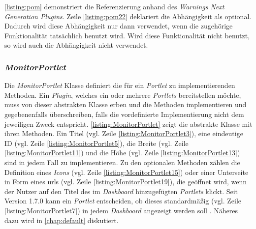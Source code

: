 

\autoref{listing:pom} demonstriert die Referenzierung anhand des \textit{Warnings Next Generation Plugins}. Zeile \autoref{listing:pom22} deklariert die Abhängigkeit als optional. Dadurch wird diese Abhängigkeit nur dann verwendet, wenn die zugehörige Funktionalität tatsächlich benutzt wird. Wird diese Funktionalität nicht benutzt, so wird auch die Abhängigkeit nicht verwendet.

\subsubsection{\textit{MonitorPortlet}}
Die \textit{MonitorPortlet} Klasse definiert die für ein \textit{Portlet} zu implementierenden Methoden. Ein \textit{Plugin}, welches ein oder mehrere \textit{Portlets} bereitstellen möchte, muss von dieser abstrakten Klasse erben und die Methoden implementieren und gegebenenfalls überschreiben, falls die vordefinierte Implementierung nicht dem jeweiligen Zweck entspricht. \autoref{listing:MonitorPortlet} zeigt die abstrakte Klasse mit ihren Methoden. Ein Titel (vgl. Zeile \autoref{listing:MonitorPortlet3}), eine eindeutige ID (vgl. Zeile \autoref{listing:MonitorPortlet5}), die Breite (vgl. Zeile \autoref{listing:MonitorPortlet11}) und die Höhe (vgl. Zeile \autoref{listing:MonitorPortlet13}) sind in jedem Fall zu implementieren. Zu den optionalen Methoden zählen die Definition eines \textit{Icons} (vgl. Zeile \autoref{listing:MonitorPortlet15}) oder einer Unterseite in Form eines \acp{url} (vgl. Zeile \autoref{listing:MonitorPortlet19}), die geöffnet wird, wenn der Nutzer auf den Titel des im \textit{Dashboard} hinzugefügten \textit{Portlets} klickt. Seit Version 1.7.0 kann ein \textit{Portlet} entscheiden, ob dieses standardmäßig (vgl. Zeile \autoref{listing:MonitorPortlet7}) in jedem \textit{Dashboard} angezeigt werden soll \citep{pull-request-monitoring-plugin}. Näheres dazu wird in \autoref{chap:default} diskutiert.



